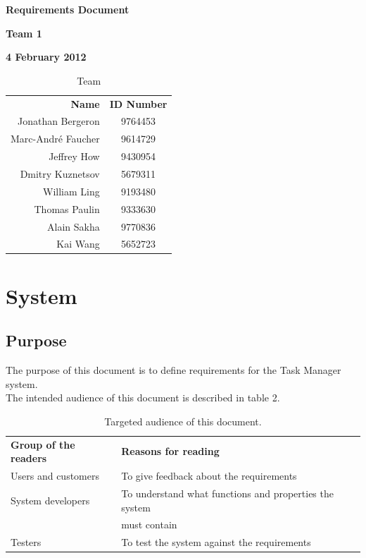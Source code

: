 \documentclass[12pt]{article}
\newcommand{\systemName}{Task Manager }
\begin{document}
\vspace*{0.5in}
\centerline{\bf\Large Requirements Document}

\vspace*{0.5in}
\centerline{\bf\Large Team 1}

\vspace*{0.5in}
\centerline{\bf\Large 4 February 2012}

\vspace*{1.5in}
\begin{table}[htbp]
\caption{Team}
\begin{center}
\begin{tabular}{|r | c|}
\hline
{\bf Name} & {\bf ID Number} \\
Jonathan Bergeron & 9764453 \\
Marc-Andr\'{e} Faucher & 9614729 \\
Jeffrey How & 9430954 \\
Dmitry Kuznetsov & 5679311 \\
William Ling & 9193480 \\
Thomas Paulin & 9333630 \\
Alain Sakha & 9770836 \\
Kai Wang & 5652723 \\
\hline
\end{tabular}
\end{center}
\end{table}

\clearpage

\section{System}

\subsection{Purpose}

The purpose of this document is to define requirements for the \systemName system. \\

The intended audience of this document is described in table 2. \\

\begin{table}[htbp]
\caption{Targeted audience of this document.}
\begin{center}
\begin{tabular}{|l | l|}
\hline
{\bf Group of the readers} & {\bf Reasons for reading}\\ \cline{1-2}
Users and customers & To give feedback about the requirements\\ \cline{1-2}
System developers & To understand what functions and properties the system \\&must contain\\ \cline{1-2}
Testers & To test the system against the requirements\\ \cline{1-2}
\hline
\end{tabular}
\end{center}
\end{table}
\end{document}

